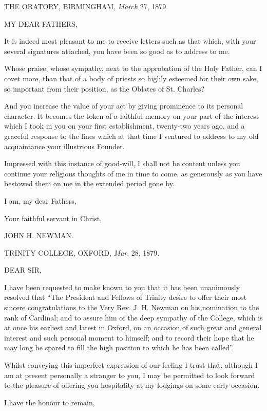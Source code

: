 THE ORATORY, BIRMINGHAM,
\emph{March} 27, 1879.

MY DEAR FATHERS,

It is indeed most pleasant to me to receive letters such as that
which, with your several signatures attached, you have been so good as
to address to me.

Whose praise, whose sympathy, next to the approbation of the Holy
Father, can I covet more, than that of a body of priests so highly
esteemed for their own sake, so important from their position, as the
Oblates of St. Charles?

And you increase the value of your act by giving prominence to its
personal character. It becomes the token of a faithful memory on your
part of the interest which I took in you on your first establishment,
twenty-two years ago, and a graceful response to the lines which
at that time I ventured to address to my old acquaintance your
illustrious Founder.

Impressed with this instance of good-will, I shall not be content
unless you continue your religious thoughts of me in time to come, as
generously as you have bestowed them on me in the extended period gone
by.

I am, my dear Fathers,

Your faithful servant in Christ,

JOHN H. NEWMAN.


TRINITY COLLEGE, OXFORD,
\emph{Mar}. 28, 1879.

DEAR SIR,

I have been requested to make known to you that it has been
unanimously resolved that ``The President and Fellows of Trinity
desire to offer their most sincere congratulations to the Very Rev. J.
H. Newman on his nomination to the rank of Cardinal; and to assure him
of the deep sympathy of the College, which is at once his earliest and
latest in Oxford, on an occasion of such great and general interest
and such personal moment to himself; and to record their hope that he
may long be spared to fill the high position to which he has been
called''.

Whilst conveying this imperfect expression of our feeling I trust
that, although I am at present personally a stranger to you, I may be
permitted to look forward to the pleasure of offering you hospitality
at my lodgings on some early occasion.

I have the honour to remain,

